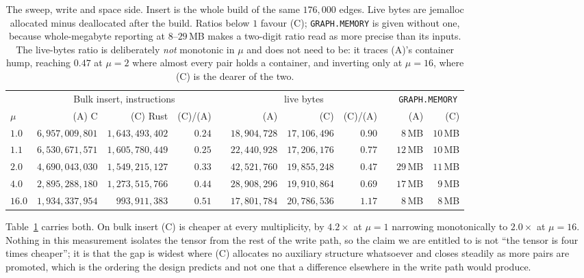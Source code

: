 \documentclass[11pt,a4paper]{article}
\theoremstyle{plain}
\theoremstyle{definition}
\theoremstyle{remark}
\begin{document}
\begin{table}[!ht]
\centering
\small
\setlength{\tabcolsep}{4.5pt}
\begin{tabular}{@{}lrrrcrrrcrr@{}}
\toprule
 & \multicolumn{3}{c}{Bulk insert, instructions} & & \multicolumn{3}{c}{live bytes} & & \multicolumn{2}{c}{\texttt{GRAPH.MEMORY}} \\
\cmidrule(lr){2-4}\cmidrule(lr){6-8}\cmidrule(lr){10-11}
$\mu$ & (A) C & (C) Rust & (C)/(A) & & (A) & (C) & (C)/(A) & & (A) & (C) \\
\midrule
$1.0$  & $6{,}957{,}009{,}801$ & $1{,}643{,}493{,}402$ & $0.24$ & & $18{,}904{,}728$ & $17{,}106{,}496$ & $0.90$ & & $8$\,MB  & $10$\,MB \\
$1.1$  & $6{,}530{,}671{,}571$ & $1{,}605{,}780{,}449$ & $0.25$ & & $22{,}440{,}928$ & $17{,}206{,}176$ & $0.77$ & & $12$\,MB & $10$\,MB \\
$2.0$  & $4{,}690{,}043{,}030$ & $1{,}549{,}215{,}127$ & $0.33$ & & $42{,}521{,}760$ & $19{,}855{,}248$ & $0.47$ & & $29$\,MB & $11$\,MB \\
$4.0$  & $2{,}895{,}288{,}180$ & $1{,}273{,}515{,}766$ & $0.44$ & & $28{,}908{,}296$ & $19{,}910{,}864$ & $0.69$ & & $17$\,MB & $9$\,MB  \\
$16.0$ & $1{,}934{,}337{,}954$ & $\phantom{0}993{,}911{,}383$ & $0.51$ & & $17{,}801{,}784$ & $20{,}786{,}536$ & $1.17$ & & $8$\,MB  & $8$\,MB  \\
\bottomrule
\end{tabular}
\caption{The sweep, write and space side. Insert is the whole build of the same
$176{,}000$ edges. Live bytes are jemalloc allocated minus deallocated after
the build. Ratios below $1$ favour (C); \texttt{GRAPH.MEMORY} is given without
one, because whole-megabyte reporting at $8$--$29$\,MB makes a two-digit ratio
read as more precise than its inputs. The live-bytes ratio is deliberately
\emph{not} monotonic in $\mu$ and does not need to be: it traces (A)'s container
hump, reaching $0.47$ at $\mu = 2$ where almost every pair holds a container,
and inverting only at $\mu = 16$, where (C) is the dearer of the two.}
\label{tab:evalwrite}
\end{table}

Table~\ref{tab:evalwrite} carries both. On bulk insert (C) is cheaper at every
multiplicity, by $4.2\times$ at $\mu = 1$ narrowing monotonically to
$2.0\times$ at $\mu = 16$. Nothing in this
measurement isolates the tensor from the rest of the write path, so the claim
we are entitled to is not ``the tensor is four times cheaper''; it is that the
gap is widest where (C) allocates no auxiliary structure whatsoever and closes
steadily as more pairs are promoted, which is the ordering the design predicts
and not one that a difference elsewhere in the write path would produce.
\end{document}
